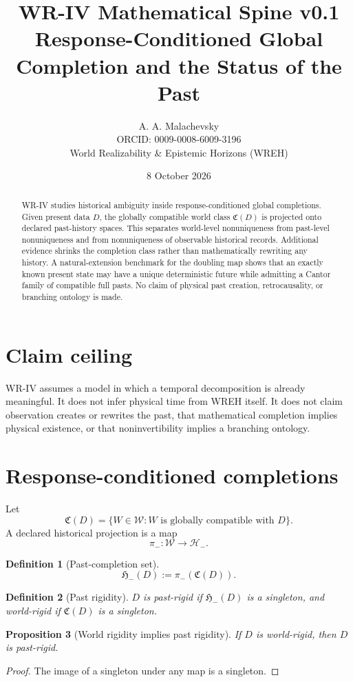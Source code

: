\documentclass[11pt]{article}
\title{\textbf{WR-IV Mathematical Spine v0.1}\\[4pt]\large Response-Conditioned Global Completion and the Status of the Past}
\author{A. A. Malachevsky\\ORCID: 0009-0008-6009-3196\\World Realizability \& Epistemic Horizons (WREH)}
\date{8 October 2026}
\newtheorem{definition}{Definition}[section]
\newtheorem{proposition}[definition]{Proposition}
\newcommand{\Wcal}{\mathcal W}
\newcommand{\Ccal}{\mathfrak C}
\newcommand{\Hminus}{\mathcal H_-}
\newcommand{\Pcal}{\mathfrak H_-}
\begin{document}
\maketitle

\begin{abstract}
WR-IV studies historical ambiguity inside response-conditioned global completions. Given present data $D$, the globally compatible world class $\Ccal(D)$ is projected onto declared past-history spaces. This separates world-level nonuniqueness from past-level nonuniqueness and from nonuniqueness of observable historical records. Additional evidence shrinks the completion class rather than mathematically rewriting any history. A natural-extension benchmark for the doubling map shows that an exactly known present state may have a unique deterministic future while admitting a Cantor family of compatible full pasts. No claim of physical past creation, retrocausality, or branching ontology is made.
\end{abstract}

\section{Claim ceiling}
WR-IV assumes a model in which a temporal decomposition is already meaningful. It does not infer physical time from WREH itself. It does not claim observation creates or rewrites the past, that mathematical completion implies physical existence, or that noninvertibility implies a branching ontology.

\section{Response-conditioned completions}
Let
\[
\Ccal(D)=\{W\in\Wcal: W\text{ is globally compatible with }D\}.
\]
A declared historical projection is a map
\[
\pi_-:\Wcal\to\Hminus.
\]
\begin{definition}[Past-completion set]
\[
\Pcal(D):=\pi_-(\Ccal(D)).
\]
\end{definition}
\begin{definition}[Past rigidity]
$D$ is past-rigid if $\Pcal(D)$ is a singleton, and world-rigid if $\Ccal(D)$ is a singleton.
\end{definition}

\begin{proposition}[World rigidity implies past rigidity]
If $D$ is world-rigid, then $D$ is past-rigid.
\end{proposition}
\begin{proof}
The image of a singleton under any map is a singleton.
\end{proof}
\end{document}
